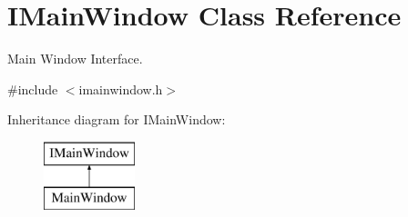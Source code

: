 \hypertarget{class_i_main_window}{\section{\-I\-Main\-Window \-Class \-Reference}
\label{class_i_main_window}
}


\-Main \-Window \-Interface.  




{\ttfamily \#include $<$imainwindow.\-h$>$}

\-Inheritance diagram for \-I\-Main\-Window\-:\begin{figure}[H]
\begin{center}
\leavevmode
\includegraphics[height=2.000000cm]{class_i_main_window}
\end{center}
\end{figure}
